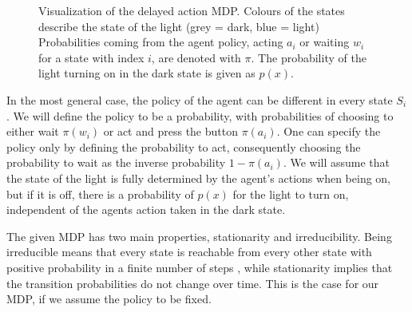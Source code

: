 \documentclass[12pt,a4paper]{article}
\begin{document}
\begin{figure}[H]
    \centering
    \caption{\label{fig:delayed_mdp} Visualization of the delayed action MDP. Colours of the states describe the state of the light (grey = dark, blue = light) Probabilities coming from the agent policy, acting $a_i$ or waiting $w_i$ for a state with index $i$, are denoted with $\pi$. The probability of the light turning on in the dark state is given as $p(x)$.}
\end{figure}

In the most general case, the policy of the agent can be different in every state $S_i$.
We will define the policy to be a probability, with probabilities of choosing to either wait $\pi(w_i)$ or act and press the button $\pi(a_i)$. One can specify the policy only by defining the probability to act, consequently choosing the probability to wait as the inverse probability $1-\pi(a_i)$.
We will assume that the state of the light is fully determined by the agent's actions when being on, but if it is off, there is a probability of $p(x)$ for the light to turn on, independent of the agents action taken in the dark state.

The given MDP has two main properties, stationarity and irreducibility.
Being irreducible means that every state is reachable from every other state with positive probability in a finite number of steps \autocite{cover1999elements}, while stationarity implies that the transition probabilities do not change over time.
This is the case for our MDP, if we assume the policy to be fixed.
\end{document}
